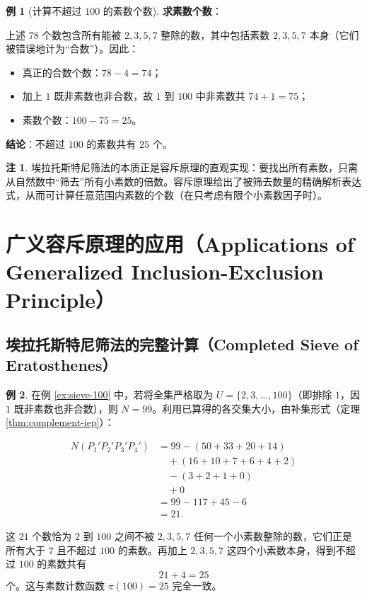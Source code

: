 \documentclass[UTF8,11pt,a4paper]{ctexbook}   %
\theoremstyle{definition}
\newtheorem{example}{例}[section]
\newtheorem{remark}{注}[section]
\begin{document}
\begin{example}[计算不超过 $100$ 的素数个数]
\textbf{求素数个数}：

上述 $78$ 个数包含所有能被 $2,3,5,7$ 整除的数，其中包括素数 $2,3,5,7$ 本身（它们被错误地计为``合数''）。因此：
\begin{itemize}
    \item 真正的合数个数：$78-4=74$；
    \item 加上 $1$ 既非素数也非合数，故 $1$ 到 $100$ 中非素数共 $74+1=75$；
    \item 素数个数：$100-75=25$。
\end{itemize}

\textbf{结论}：不超过 $100$ 的素数共有 $\boxed{25}$ 个。
\end{example}

\begin{remark}
埃拉托斯特尼筛法的本质正是容斥原理的直观实现：要找出所有素数，只需从自然数中``筛去''所有小素数的倍数。容斥原理给出了被筛去数量的精确解析表达式，从而可计算任意范围内素数的个数（在只考虑有限个小素数因子时）。
\end{remark}

\section{广义容斥原理的应用（Applications of Generalized Inclusion-Exclusion Principle）}

\subsection{埃拉托斯特尼筛法的完整计算（Completed Sieve of Eratosthenes）}

\begin{example}
在例 \ref{ex:sieve-100} 中，若将全集严格取为 $U=\{2,3,\dots,100\}$（即排除 $1$，因 $1$ 既非素数也非合数），则 $N=99$。利用已算得的各交集大小，由补集形式（定理 \ref{thm:complement-iep}）：

\begin{align*}
N(P_1'P_2'P_3'P_4')
&= 99 - (50+33+20+14)\\
&\quad +(16+10+7+6+4+2)\\
&\quad -(3+2+1+0)\\
&\quad +0\\
&= 99 - 117 + 45 - 6\\
&= \boxed{21}.
\end{align*}

这 $21$ 个数恰为 $2$ 到 $100$ 之间不被 $2,3,5,7$ 任何一个小素数整除的数，它们正是所有大于 $7$ 且不超过 $100$ 的素数。再加上 $2,3,5,7$ 这四个小素数本身，得到不超过 $100$ 的素数共有
\[
21+4=\boxed{25}
\]
个。这与素数计数函数 $\pi(100)=25$ 完全一致。
\end{example}
\end{document}
